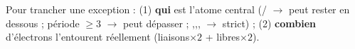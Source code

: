 \documentclass[11pt,a4paper]{article}
\begin{document}
\begin{astucebox}
Pour trancher une exception : (1) \textbf{qui} est l'atome central (/ $\to$ peut
rester en dessous ; période $\geq 3$ $\to$ peut dépasser ; ,,, $\to$
strict) ; (2) \textbf{combien} d'électrons l'entourent réellement (liaisons$\times2$ + libres$\times2$).
\end{astucebox}
\end{document}
